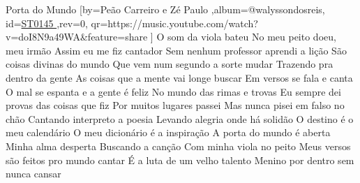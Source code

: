 \beginsong
{Porta do Mundo %
}[by={Peão Carreiro e Zé Paulo %
},album={@walyssondosreis},
id={\href{https://music.youtube.com/watch?v=doI8N9a49WA&feature=share %
}{ST0145 %
}},rev={0}, %
qr={https://music.youtube.com/watch?v=doI8N9a49WA&feature=share %
}]
\beginverse
O som da viola bateu
No meu peito doeu, meu irmão
Assim eu me fiz cantador
Sem nenhum professor aprendi a lição
São coisas divinas do mundo
Que vem num segundo a sorte mudar
Trazendo pra dentro da gente
As coisas que a mente vai longe buscar
\endverse
\beginverse
Em versos se fala e canta
O mal se espanta e a gente é feliz
No mundo das rimas e trovas
Eu sempre dei provas das coisas que fiz
Por muitos lugares passei
Mas nunca pisei em falso no chão
Cantando interpreto a poesia
Levando alegria onde há solidão
\endverse
\beginverse
O destino é o meu calendário
O meu dicionário é a inspiração
A porta do mundo é aberta
Minha alma desperta
Buscando a canção
Com minha viola no peito
Meus versos são feitos pro mundo cantar
É a luta de um velho talento
Menino por dentro sem nunca cansar
\endverse
\vspace{4em} %
\begin{comment}
\lstset{basicstyle=\scriptsize\bf} %
\tab{Solo 1}
\begin{lstlisting}
E|-----------------------------------------------------|
B|-----------------------------------------------------|
G|-----------------------------------------------------|
D|-----------------------------------------------------|
A|-----------------------------------------------------|
E|-----------------------------------------------------|
\end{lstlisting}
\end{comment}
